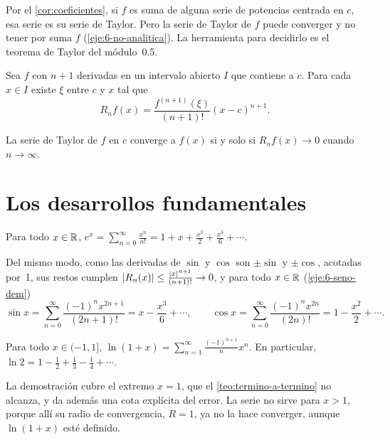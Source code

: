Por el \cref{cor:coeficientes}, si $f$ es suma de alguna serie de potencias centrada en $c$, esa serie es su serie de Taylor. Pero la serie de Taylor de $f$ puede converger y no tener por suma $f$ (\cref{eje:6-no-analitica}). La herramienta para decidirlo es el teorema de Taylor del módulo~0.5.

\begin{teorema}\label{teo:taylor-lagrange}
Sea $f$ con $n+1$ derivadas en un intervalo abierto $I$ que contiene a $c$. Para cada $x\in I$ existe $\xi$ entre $c$ y $x$ tal que
\[
R_nf(x)=\frac{f^{(n+1)}(\xi)}{(n+1)!}(x-c)^{n+1}.
\]
\end{teorema}

\begin{proposicion}\label{prop:taylor-converge}
La serie de Taylor de $f$ en $c$ converge a $f(x)$ si y solo si $R_nf(x)\to0$ cuando $n\to\infty$.
\end{proposicion}

\section{Los desarrollos fundamentales}

\begin{teorema}[Exponencial]\label{teo:exp}
Para todo $x\in\mathbb{R}$, $\displaystyle e^{x}=\sum_{n=0}^{\infty}\frac{x^{n}}{n!}=1+x+\frac{x^{2}}{2}+\frac{x^{3}}{6}+\cdots$.
\end{teorema}

Del mismo modo, como las derivadas de $\sin$ y $\cos$ son $\pm\sin$ y $\pm\cos$, acotadas por~1, sus restos cumplen $\lvert R_n(x)\rvert\le\frac{\lvert x\rvert^{n+1}}{(n+1)!}\to0$, y para todo $x\in\mathbb{R}$ (\cref{eje:6-seno-dem})
\[
\sin x=\sum_{n=0}^{\infty}\frac{(-1)^{n}x^{2n+1}}{(2n+1)!}=x-\frac{x^{3}}{6}+\cdots,\qquad
\cos x=\sum_{n=0}^{\infty}\frac{(-1)^{n}x^{2n}}{(2n)!}=1-\frac{x^{2}}{2}+\cdots.
\]

\begin{teorema}[Logaritmo]\label{teo:ln}
Para todo $x\in(-1,1]$, $\displaystyle\ln(1+x)=\sum_{n=1}^{\infty}\frac{(-1)^{n+1}}{n}x^{n}$. En particular, $\displaystyle\ln2=1-\frac12+\frac13-\frac14+\cdots$.
\end{teorema}

La demostración cubre el extremo $x=1$, que el \cref{teo:termino-a-termino} no alcanza, y da además una cota explícita del error. La serie no sirve para $x>1$, porque allí su radio de convergencia, $R=1$, ya no la hace converger, aunque $\ln(1+x)$ esté definido.

